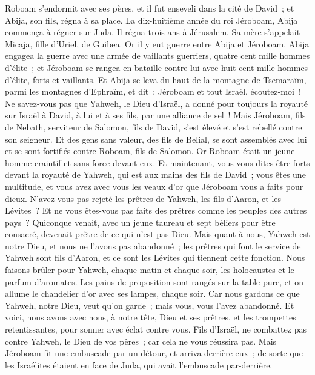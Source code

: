 \begin{multicols}{2}
Roboam s'endormit avec ses pères, et il fut enseveli dans la cité de David~; et Abija, son fils, régna à sa place.
\VerseOne{}La dix-huitième année du roi Jéroboam, Abija commença à régner sur Juda.
Il régna trois ans à Jérusalem. Sa mère s'appelait Micaja, fille d'Uriel, de Guibea. Or il y eut guerre entre Abija et Jéroboam.
Abija engagea la guerre avec une armée de vaillants guerriers, quatre cent mille hommes d'élite~; et Jéroboam se rangea en bataille contre lui avec huit cent mille hommes d'élite, forts et vaillants.
Et Abija se leva du haut de la montagne de Tsemaraïm, parmi les montagnes d'Ephraïm, et dit~: Jéroboam et tout Israël, écoutez-moi~!
Ne savez-vous pas que Yahweh, le Dieu d'Israël, a donné pour toujours la royauté sur Israël à David, à lui et à ses fils, par une alliance de sel~!
Mais Jéroboam, fils de Nebath, serviteur de Salomon, fils de David, s'est élevé et s'est rebellé contre son seigneur.
Et des gens sans valeur, des fils de Belial, se sont assemblés avec lui et se sont fortifiés contre Roboam, fils de Salomon. Or Roboam était un jeune homme craintif et sans force devant eux.
Et maintenant, vous vous dites être forts devant la royauté de Yahweh, qui est aux mains des fils de David~; vous êtes une multitude, et vous avez avec vous les veaux d'or que Jéroboam vous a faits pour dieux.
N'avez-vous pas rejeté les prêtres de Yahweh, les fils d'Aaron, et les Lévites~? Et ne vous êtes-vous pas faits des prêtres comme les peuples des autres pays~? Quiconque venait, avec un jeune taureau et sept béliers pour être consacré, devenait prêtre de ce qui n'est pas Dieu.
Mais quant à nous, Yahweh est notre Dieu, et nous ne l'avons pas abandonné~; les prêtres qui font le service de Yahweh sont fils d'Aaron, et ce sont les Lévites qui tiennent cette fonction.
Nous faisons brûler pour Yahweh, chaque matin et chaque soir, les holocaustes et le parfum d'aromates. Les pains de proposition sont rangés sur la table pure, et on allume le chandelier d'or avec ses lampes, chaque soir. Car nous gardons ce que Yahweh, notre Dieu, veut qu'on garde~; mais vous, vous l'avez abandonné.
Et voici, nous avons avec nous, à notre tête, Dieu et ses prêtres, et les trompettes retentissantes, pour sonner avec éclat contre vous. Fils d'Israël, ne combattez pas contre Yahweh, le Dieu de vos pères~; car cela ne vous réussira pas.
Mais Jéroboam fit une embuscade par un détour, et arriva derrière eux~; de sorte que les Israélites étaient en face de Juda, qui avait l'embuscade par-derrière.

\end{multicols}
